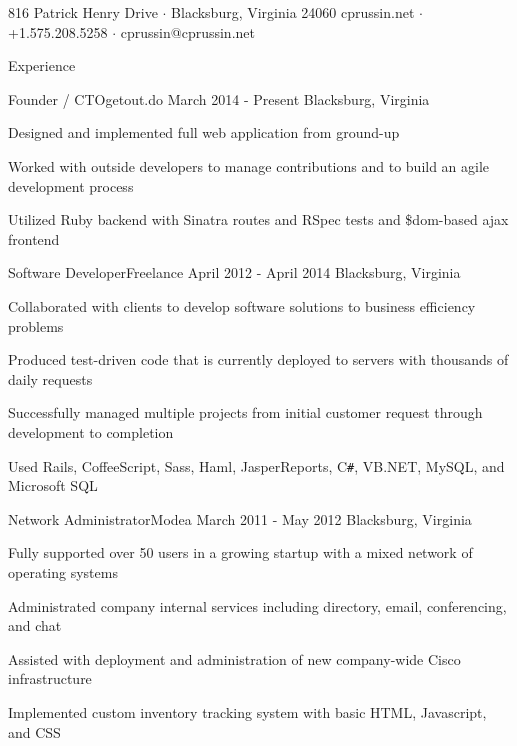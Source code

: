 \documentclass{resume}
\begin{document}
	           {816 Patrick Henry Drive $\cdot$ Blacksburg, Virginia 24060}
	           {cprussin.net $\cdot$ +1.575.208.5258 $\cdot$ cprussin@cprussin.net}

	\begin{section}{Experience}
		\begin{experience}{Founder / CTO}{getout.do}
		                  {March 2014 - Present}
		                  {Blacksburg, Virginia}
			\item Designed and implemented full web application from ground-up
			\item Worked with outside developers to manage contributions and to build
			      an agile development process
			\item Utilized Ruby backend with Sinatra routes and RSpec tests and
			      \$dom-based ajax frontend
		\end{experience}

		\begin{experience}{Software Developer}{Freelance}
		                  {April 2012 - April 2014}
		                  {Blacksburg, Virginia}
			\item Collaborated with clients to develop software solutions to business
			      efficiency problems
			\item Produced test-driven code that is currently deployed to servers
			      with thousands of daily requests
			\item Successfully managed multiple projects from initial customer
			      request through development to completion
			\item Used Rails, CoffeeScript, Sass, Haml, JasperReports, C\texttt{\#},
			      VB.NET, MySQL, and Microsoft SQL
		\end{experience}

		\begin{experience}{Network Administrator}{Modea}
		                  {March 2011 - May 2012}
		                  {Blacksburg, Virginia}
			\item Fully supported over 50 users in a growing startup with a mixed
			      network of operating systems
			\item Administrated company internal services including directory, email,
			      conferencing, and chat
			\item Assisted with deployment and administration of new company-wide
			      Cisco infrastructure
			\item Implemented custom inventory tracking system with basic HTML,
			      Javascript, and CSS
		\end{experience}


\end{section}
\end{document}
